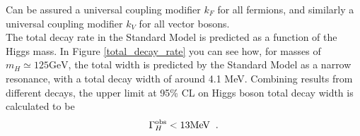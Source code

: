 Can be assured a universal coupling modifier $k_F$ for all fermions, and similarly a universal coupling modifier $k_V$ for all vector bosons.
\\
The total decay rate in the Standard Model is predicted as a function of the Higgs mass. In Figure \ref{total_decay_rate} you can see how, for masses of $m_H \simeq 125 \text{GeV}$, the total width is predicted by the Standard Model as a narrow resonance, with a total decay width of around 4.1 MeV. Combining results from different decays, the upper limit at 95\% CL on Higgs boson total decay width is calculated to be \cite{Khachatryan2016}
\begin{equation}
\Gamma_H^{\text{obs}} < 13 \text{MeV} \hspace{0.2cm} \text{.}
\end{equation}